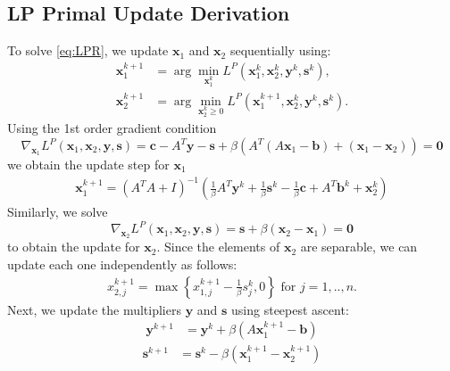 \documentclass{article}
\begin{document}
\subsection*{LP Primal Update Derivation}
To solve \eqref{eq:LPR}, we update $\mathbf{x}_{1}$ and $\mathbf{x}_{2}$ sequentially using:
\begin{align}
\mathbf{x}_{1}^{k+1} & = \arg \min_{\mathbf{x}_{1}^{k}} L^{P}(\mathbf{x}_{1}^{k},\mathbf{x}_{2}^{k},\mathbf{y}^{k},\mathbf{s}^k),\\
\mathbf{x}_{2}^{k+1} & = \arg \min_{\mathbf{x}_{2}^{k} \geq 0} L^{P}(\mathbf{x}_{1}^{k+1},\mathbf{x}_{2}^{k},\mathbf{y}^{k},\mathbf{s}^k).
\end{align}
Using the 1st order gradient condition
\[
\nabla_{\mathbf{x}_{1}}L^{P}(\mathbf{x}_{1},\mathbf{x}_{2},\mathbf{y}, \mathbf{s})=\mathbf{c}-A^{T}\mathbf{y}-\mathbf{s}+\beta\left(A^{T}\left(A\mathbf{x}_{1}-\mathbf{b}\right)+\left(\mathbf{x}_{1}-\mathbf{x}_{2}\right)\right) = \mathbf{0}
\]
we obtain the update step for $\mathbf{x}_{1}$
\begin{align}\label{eq:x1_primal_update}
\mathbf{x}_{1}^{k+1} = \left(A^{T}A+I\right)^{-1}\left(\frac{1}{\beta}A^{T}\mathbf{y}^k+\frac{1}{\beta}\mathbf{s}^k-\frac{1}{\beta}\mathbf{c}+A^{T}\mathbf{b}^k+\mathbf{x}_{2}^k\right)
\end{align}
Similarly, we solve
\[
\nabla_{\mathbf{x}_{2}}L^{P}(\mathbf{x}_{1},\mathbf{x}_{2},\mathbf{y}, \mathbf{s})=\mathbf{s}+\beta\left(\mathbf{x}_{2}-\mathbf{x}_{1}\right) = \mathbf{0}
\]
to obtain the update for $\mathbf{x}_{2}$. Since the elements of $\mathbf{x}_{2}$ are separable, we can update each one independently as follows:
\begin{align}
{x}_{2,j}^{k+1} = \max\left\{ {x}_{1,j}^{k+1}-\frac{1}{\beta}{s}_j^k,0\right\} \text{ for $j = 1,..,n$}.
\end{align}
Next, we update the multipliers $\mathbf{y}$ and $\mathbf{s}$ using steepest ascent:
\begin{align}\label{eq:y_primal_update}
\mathbf{y}^{k+1} &= \mathbf{y}^{k} + \beta (A \mathbf{x}_1^{k+1}  - \mathbf{b}) 
\end{align}
\begin{align}\label{eq:s_primal_update}
\mathbf{s}^{k+1} &= \mathbf{s}^{k}  - \beta  (\mathbf{x}_1^{k+1}  -\mathbf{x}_2^{k+1} )
\end{align}


\end{document}
